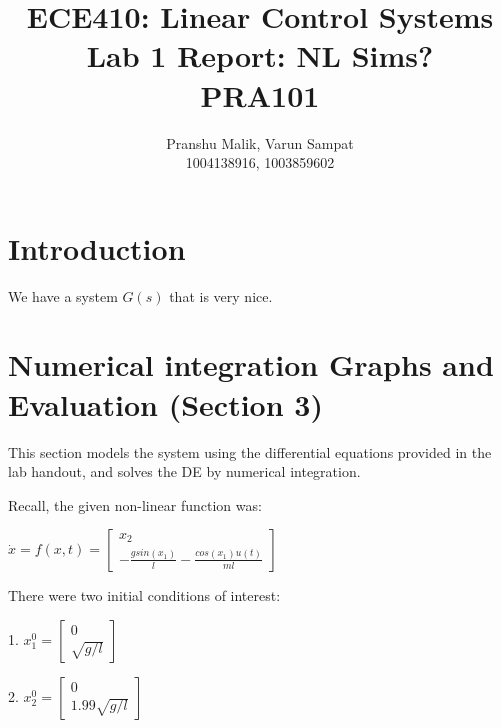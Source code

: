 \documentclass[10pt]{article}
\date{}
\begin{document}
\title{\textbf{\Large{\textsc{ECE410:} Linear Control Systems}} \\ \Large{Lab 1 Report: NL Sims?} \\ \textbf{\small{PRA101}}\vspace{-0.3cm}}
\author{Pranshu Malik, Varun Sampat \\ \footnotesize{1004138916}, \footnotesize{1003859602}\vspace{-3cm}}

\maketitle

\section{Introduction}
We have a system $G(s)$ that is very nice.


\section{Numerical integration Graphs and Evaluation (Section 3)}
This section models the system using the differential equations provided in the lab handout, and solves the DE by numerical integration. 

Recall, the given non-linear function was:
\begin{center}
   \begin{math}
    \dot{x} = f(x, t) = 
        \begin{bmatrix}
        x_2\\
        -\frac{g sin(x_1)}{l} - \frac{cos(x_1) u(t)}{ml}
        \end{bmatrix}
    \end{math} 
\end{center}

There were two initial conditions of interest:
\begin{center}
    1.
    \begin{math}
     x^0_1 = 
     \begin{bmatrix}
     0\\ \sqrt{g/l}
     \end{bmatrix}
    \end{math}
\end{center}

\begin{center}
    2. 
    \begin{math}
     x^0_2 = 
     \begin{bmatrix}
     0\\1.99 \sqrt{g/l}
     \end{bmatrix}
    \end{math}
\end{center}
\end{document}
